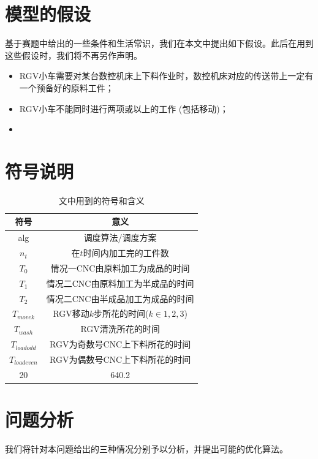 \documentclass{cumcmthesis}
\begin{document}
	\section{模型的假设}
	基于赛题中给出的一些条件和生活常识，我们在本文中提出如下假设。此后在用到这些假设时，我们将不再另作声明。
	\begin{itemize}
	\item RGV小车需要对某台数控机床上下料作业时，数控机床对应的传送带上一定有一个预备好的原料工件；
	\item RGV小车不能同时进行两项或以上的工作 (包括移动)；
	\item 
	\end{itemize}
	
	
	\section{符号说明}
	\begin{table}[!htbp]
		\centering
		\begin{tabular}{cc}
		\toprule[1.5pt]
		符号 & 意义\\
		\midrule[1pt]
		alg     & 调度算法/调度方案 \\
		$n_t$ & 在$t$时间内加工完的工件数  \\
		$T_0$ & 情况一CNC由原料加工为成品的时间 \\
		$T_1$ & 情况二CNC由原料加工为半成品的时间 \\
		$T_2$ & 情况二CNC由半成品加工为成品的时间 \\
		$T_{move k}$ & RGV移动$k$步所花的时间($k\in{1, 2, 3}$) \\
		$T_{wash}$ & RGV清洗所花的时间 \\
		$T_{load odd}$ & RGV为奇数号CNC上下料所花的时间 \\
		$T_{load even}$ & RGV为偶数号CNC上下料所花的时间 \\
		20 & 640.2 \\
		\bottomrule[1.5pt]
		\end{tabular}
		\caption{文中用到的符号和含义}\label{fuHaoShuoMing}
	\end{table}
	
	\section{问题分析}
	我们将针对本问题给出的三种情况分别予以分析，并提出可能的优化算法。
\end{document}
